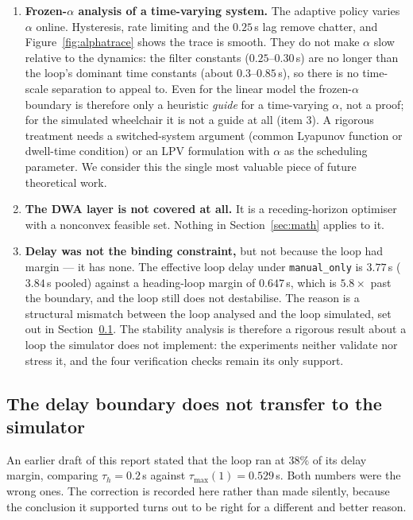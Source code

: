 \documentclass[11pt,a4paper]{article}
\newcommand{\vmanual}{\texttt{manual\_only}}
\theoremstyle{plain}
\theoremstyle{definition}
\begin{document}
\begin{enumerate}
\item \textbf{Frozen-$\alpha$ analysis of a time-varying system.} The
adaptive policy varies $\alpha$ online. Hysteresis, rate limiting and
the $0.25$\,s lag remove chatter, and Figure~\ref{fig:alphatrace} shows
the trace is smooth. They do not make $\alpha$ slow relative to the
dynamics: the filter constants ($0.25$--$0.30$\,s) are no longer than
the loop's dominant time constants (about $0.3$--$0.85$\,s), so there
is no time-scale separation to appeal to. Even for the linear model the
frozen-$\alpha$ boundary is therefore only a heuristic \emph{guide} for
a time-varying $\alpha$, not a proof; for the simulated wheelchair it
is not a guide at all (item 3). A
rigorous treatment needs a switched-system argument (common Lyapunov
function or dwell-time condition) or an LPV formulation with $\alpha$ as
the scheduling parameter. We consider this the single most valuable
piece of future theoretical work.

\item \textbf{The DWA layer is not covered at all.} It is a receding-horizon
optimiser with a nonconvex feasible set. Nothing in
Section~\ref{sec:math} applies to it.

\item \textbf{Delay was not the binding constraint,} but not because the
loop had margin --- it has none. The effective loop delay under \vmanual{}
is $3.77$\,s ($3.84$\,s pooled) against a heading-loop margin of
$0.647$\,s, which is $5.8\times$ past the boundary, and the loop still
does not destabilise. The reason is a
structural mismatch between the loop analysed and the loop simulated,
set out in Section~\ref{sec:delaytruth}. The stability analysis is
therefore a rigorous result about a loop the simulator does not
implement: the experiments neither validate nor stress it, and the four
verification checks remain its only support.
\end{enumerate}

\subsection{The delay boundary does not transfer to the simulator}
\label{sec:delaytruth}

An earlier draft of this report stated that the loop ran at $38\%$ of
its delay margin, comparing $\tau_h = 0.2$\,s against $\tau_{\max}(1) =
0.529$\,s. Both numbers were the wrong ones. The correction is recorded
here rather than made silently, because the conclusion it supported
turns out to be right for a different and better reason.
\end{document}
